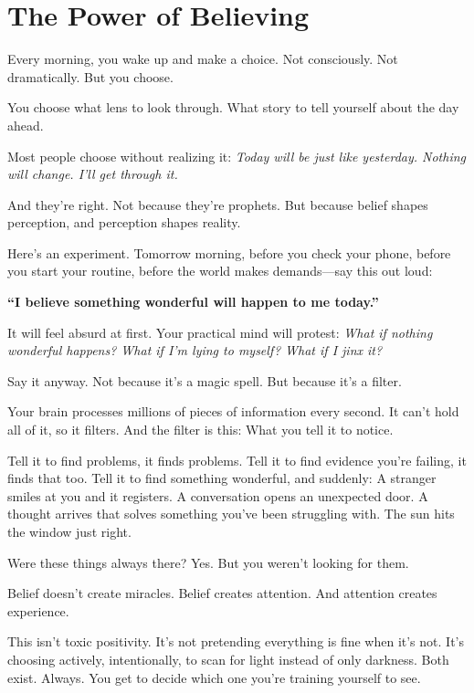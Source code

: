 \documentclass[11pt, a5paper, openright]{book}
\begin{document}
\chapter{The Power of Believing}

Every morning, you wake up and make a choice. Not consciously. Not dramatically. But you choose.

You choose what lens to look through. What story to tell yourself about the day ahead.

Most people choose without realizing it: \textit{Today will be just like yesterday. Nothing will change. I'll get through it.}

And they're right. Not because they're prophets. But because belief shapes perception, and perception shapes reality.

Here's an experiment. Tomorrow morning, before you check your phone, before you start your routine, before the world makes demands—say this out loud:

\begin{center}
\textbf{``I believe something wonderful will happen to me today.''}
\end{center}

It will feel absurd at first. Your practical mind will protest: \textit{What if nothing wonderful happens? What if I'm lying to myself? What if I jinx it?}

Say it anyway. Not because it's a magic spell. But because it's a filter.

Your brain processes millions of pieces of information every second. It can't hold all of it, so it filters. And the filter is this: What you tell it to notice.

Tell it to find problems, it finds problems. Tell it to find evidence you're failing, it finds that too. Tell it to find something wonderful, and suddenly: A stranger smiles at you and it registers. A conversation opens an unexpected door. A thought arrives that solves something you've been struggling with. The sun hits the window just right.

Were these things always there? Yes. But you weren't looking for them.

Belief doesn't create miracles. Belief creates attention. And attention creates experience.

This isn't toxic positivity. It's not pretending everything is fine when it's not. It's choosing actively, intentionally, to scan for light instead of only darkness. Both exist. Always. You get to decide which one you're training yourself to see.
\end{document}
